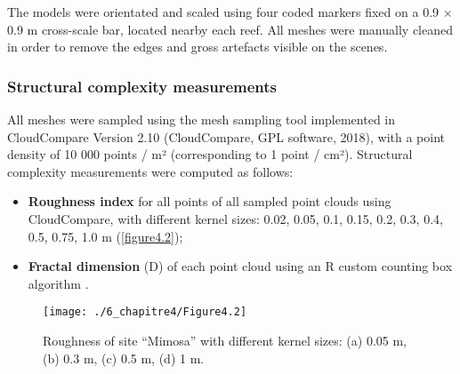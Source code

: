 The models were orientated and scaled using four coded markers fixed on a 0.9 $\times$ 0.9 m cross-scale bar, located nearby each reef. All meshes were manually cleaned in order to remove the edges and gross artefacts visible on the scenes.

\subsubsection{Structural complexity measurements}\label{chapitre4_2.1.2}
All meshes were sampled using the mesh sampling tool implemented in CloudCompare Version 2.10 (CloudCompare, GPL software, 2018), with a point density of 10 000 points / m² (corresponding to 1 point / cm²). Structural complexity measurements were computed as follows:

\begin{itemize}
    \item \textbf{Roughness index} for all points of all sampled point clouds using CloudCompare, with different kernel sizes: 0.02, 0.05, 0.1, 0.15, 0.2, 0.3, 0.4, 0.5, 0.75, 1.0 m (\autoref{figure4.2});
    
    \item \textbf{Fractal dimension} (D) of each point cloud using an R \citep{r_core_team_r_2020} custom counting box algorithm \citep{liebovitch_fast_1989}.
    
\end{itemize}

\begin{figure}[H]
	\begin{center}
	\texttt{[image: ./6\_chapitre4/Figure4.2]}
		\caption[Roughness of site “Mimosa” with different kernel sizes]{Roughness of site “Mimosa” with different kernel sizes: (a) 0.05 m, (b) 0.3 m, (c) 0.5 m, (d) 1 m.}
	\label{figure4.2}
\end{center}
\end{figure}

\newpage


